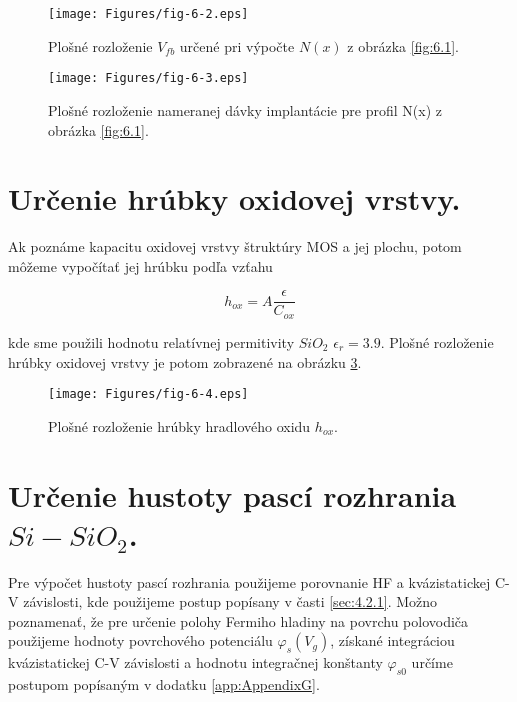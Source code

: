 \begin{figure}[h!]\centering
\texttt{[image: Figures/fig-6-2.eps]}
\captionsetup{justification=raggedright, singlelinecheck=false}
\caption[Plošné rozloženie $V_{fb}$]{Plošné rozloženie $V_{fb}$ určené
  pri výpočte $N(x)$ z obrázka \ref{fig:6.1}.}
\label{fig:6.2}
\end{figure}

\begin{figure}[h!]\centering
\texttt{[image: Figures/fig-6-3.eps]}
\captionsetup{justification=raggedright, singlelinecheck=false}
\caption[Plošné rozloženie nameranej dávky implantácie]{Plošné
  rozloženie nameranej dávky implantácie pre profil N(x) z obrázka
  \ref{fig:6.1}.}
\label{fig:6.3}
\end{figure}


\section{Určenie hrúbky oxidovej vrstvy.}\label{sec:6.2}

Ak poznáme kapacitu oxidovej vrstvy štruktúry MOS a jej plochu, potom
môžeme vypočítať jej hrúbku podľa vzťahu

\begin{equation}\label{eq:6.3}
h_{ox} = A \frac{\epsilon}{C_{ox}}
\end{equation}

kde sme použili hodnotu relatívnej permitivity $SiO_{2}$
$\epsilon_{r}=3.9$. Plošné rozloženie hrúbky oxidovej vrstvy je potom
zobrazené na obrázku \ref{fig:6.4}.

\begin{figure}[h!]\centering
\texttt{[image: Figures/fig-6-4.eps]}
\captionsetup{justification=raggedright, singlelinecheck=false}
\caption[Plošné rozloženie hrúbky hradlového oxidu $h_{ox}$]{Plošné
  rozloženie hrúbky hradlového oxidu $h_{ox}$.}
\label{fig:6.4}
\end{figure}


\section{Určenie hustoty pascí rozhrania $Si-SiO_{2}$.}\label{sec:6.3}

Pre výpočet hustoty pascí rozhrania použijeme porovnanie HF a
kvázistatickej C-V závislosti, kde použijeme postup popísany v časti
\ref{sec:4.2.1}. Možno poznamenať, že pre určenie polohy Fermiho
hladiny na povrchu polovodiča použijeme hodnoty povrchového potenciálu
$\varphi_{s}(V_{g})$, získané integráciou kvázistatickej C-V
závislosti a hodnotu integračnej konštanty $\varphi_{s0}$ určíme
postupom popísaným v dodatku \ref{app:AppendixG}.

